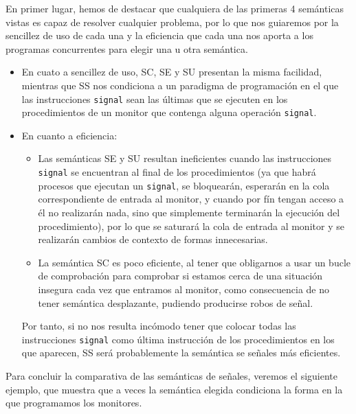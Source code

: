 En primer lugar, hemos de destacar que cualquiera de las primeras 4 semánticas vistas es capaz de resolver cualquier problema, por lo que nos guiaremos por la sencillez de uso de cada una y la eficiencia que cada una nos aporta a los programas concurrentes para elegir una u otra semántica.
\begin{itemize}
    \item En cuato a sencillez de uso, SC, SE y SU presentan la misma facilidad, mientras que SS nos condiciona a un paradigma de programación en el que las instrucciones \verb|signal| sean las últimas que se ejecuten en los procedimientos de un monitor que contenga alguna operación \verb|signal|.
    \item En cuanto a eficiencia:
        \begin{itemize}
            \item Las semánticas SE y SU resultan ineficientes cuando las instrucciones \verb|signal| se encuentran al final de los procedimientos (ya que habrá procesos que ejecutan un \verb|signal|, se bloquearán, esperarán en la cola correspondiente de entrada al monitor, y cuando por fín tengan acceso a él no realizarán nada, sino que simplemente terminarán la ejecución del procedimiento), por lo que se saturará la cola de entrada al monitor y se realizarán cambios de contexto de formas innecesarias.
            \item La semántica SC es poco eficiente, al tener que obligarnos a usar un bucle de comprobación para comprobar si estamos cerca de una situación insegura cada vez que entramos al monitor, como consecuencia de no tener semántica desplazante, pudiendo producirse robos de señal.
        \end{itemize}
        Por tanto, si no nos resulta incómodo tener que colocar todas las instrucciones \verb|signal| como última instrucción de los procedimientos en los que aparecen, SS será probablemente la semántica se señales más eficientes.
\end{itemize}

Para concluir la comparativa de las semánticas de señales, veremos el siguiente ejemplo, que muestra que a veces la semántica elegida condiciona la forma en la que programamos los monitores.


